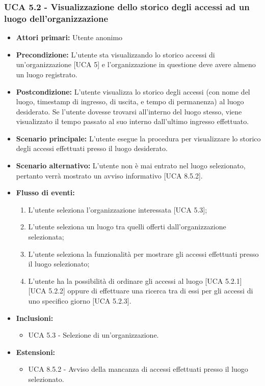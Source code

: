 \subsubsection{UCA 5.2 - Visualizzazione dello storico degli accessi ad un luogo dell'organizzazione}
\begin{itemize}
    \item \textbf{Attori primari:} Utente anonimo
    \item \textbf{Precondizione:} L'utente sta visualizzando lo storico accessi di un'organizzazione [UCA 5] e l'organizzazione in questione deve avere almeno un luogo registrato.
    \item \textbf{Postcondizione:} L'utente visualizza lo storico degli accessi (con nome del luogo, timestamp di ingresso, di uscita, e tempo di permanenza) al luogo desiderato. Se l'utente dovesse trovarsi all'interno del luogo stesso, viene visualizzato il tempo passato al suo interno dall'ultimo ingresso effettuato.
    \item \textbf{Scenario principale:} L'utente esegue la procedura per visualizzare lo storico degli accessi effettuati presso il luogo desiderato.
    \item \textbf{Scenario alternativo:} L'utente non è mai entrato nel luogo selezionato, pertanto verrà mostrato un avviso informativo [UCA 8.5.2].
    \item \textbf{Flusso di eventi:}
    \begin{enumerate}
        \item L'utente seleziona l'organizzazione interessata [UCA 5.3];
        \item L'utente seleziona un luogo tra quelli offerti dall'organizzazione selezionata;
        \item L'utente seleziona la funzionalità per mostrare gli accessi effettuati presso il luogo selezionato;
        \item L'utente ha la possibilità di ordinare gli accessi al luogo [UCA 5.2.1] [UCA 5.2.2] oppure di effettuare una ricerca tra di essi per gli accessi di uno specifico giorno [UCA 5.2.3].
    \end{enumerate}
    \item \textbf{Inclusioni:}
    \begin{itemize}
        \item UCA 5.3 - Selezione di un'organizzazione.
    \end{itemize}
    \item \textbf{Estensioni:}
    \begin{itemize}
        \item UCA 8.5.2 - Avviso della mancanza di accessi effettuati presso il luogo selezionato.
    \end{itemize}
\end{itemize}

